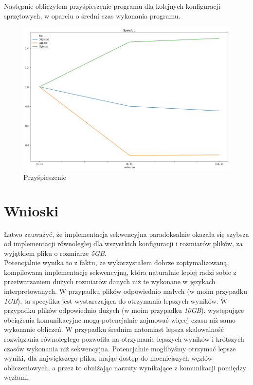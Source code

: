 \documentclass{article}
\begin{document}
    \newpage
    Następnie obliczyłem przyśpieszenie programu dla kolejnych konfiguracji sprzętowych, w oparciu o średni czas wykonania programu. 
    \begin{figure}[h!]
        \centering
        \includegraphics[width=13cm]{ex4/report/speedup.png}
        \caption{Przyśpieszenie}
    \end{figure}

    \section{Wnioski}
    Łatwo zauważyć, że implementacja sekwencyjna paradoksalnie okazała się szybsza od implementacji równoległej dla wszystkich konfiguracji i rozmiarów plików, za wyjątkiem pliku o rozmiarze \textit{5GB}.\\
    
    Potencjalnie wynika to z faktu, że wykorzystałem dobrze zoptymalizowaną, kompilowaną implementację sekwencyjną, która naturalnie lepiej radzi sobie z przetwarzaniem dużych rozmiarów danych niż te wykonane w językach interpretowanych. W przypadku plików odpowiednio małych (w moim przypadku \textit{1GB}), ta specyfika jest wystarczająca do otrzymania lepszych wyników. W przypadku plików odpowiednio dużych (w moim przypadku \textit{10GB}), występujące obciążenia komunikacyjne mogą potencjalnie zajmować więcej czasu niż samo wykonanie obliczeń. W przypadku średnim natomiast lepsza skalowalność rozwiązania równoległego pozwoliła na otrzymanie lepszych wyników i krótszych czasów wykonania niż sekwencyjna. Potencjalnie moglibyśmy otrzymać lepsze wyniki, dla największego pliku, mając dostęp do mocniejszych węzłów obliczeniowych, a przez to obniżając narzuty wynikające z komunikacji pomiędzy węzłami. \\
    
\end{document}
